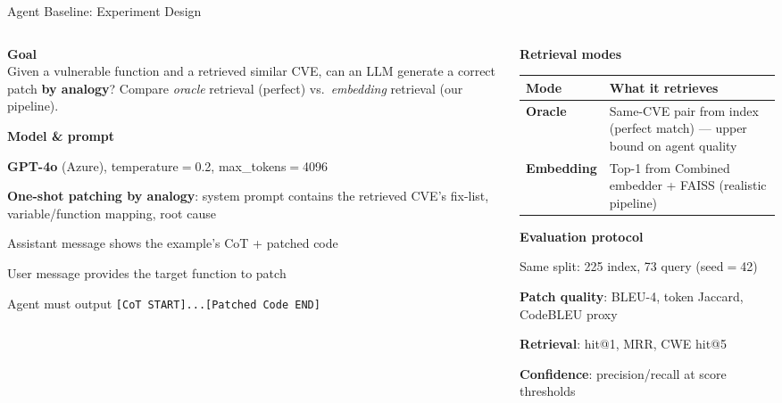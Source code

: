 \documentclass[aspectratio=169,10pt]{beamer}
\begin{document}
\begin{frame}{Agent Baseline: Experiment Design}
\begin{columns}[T]
\begin{column}{0.52\textwidth}

  \textbf{Goal}\\[3pt]
  {\small Given a vulnerable function and a retrieved similar CVE,
  can an LLM generate a correct patch \textbf{by analogy}?
  Compare \textit{oracle} retrieval (perfect) vs.\ \textit{embedding} retrieval (our pipeline).}

  \vspace{0.6em}
  \textbf{Model \& prompt}
  \begin{itemize}\setlength{\itemsep}{2pt}
    {\scriptsize
    \item \textbf{GPT-4o} (Azure), temperature$=$0.2, max\_tokens$=$4096
    \item \textbf{One-shot patching by analogy}: system prompt contains the
          retrieved CVE's fix-list, variable/function mapping, root cause
    \item Assistant message shows the example's CoT + patched code
    \item User message provides the target function to patch
    \item Agent must output \texttt{[CoT START]...[Patched Code END]}}
  \end{itemize}

\end{column}
\begin{column}{0.45\textwidth}

  \textbf{Retrieval modes}

  \vspace{0.3em}
  {\small
  \renewcommand{\arraystretch}{1.25}
  \begin{tabular}{p{1.5cm}p{4.5cm}}
    \toprule
    \textbf{Mode} & \textbf{What it retrieves} \\
    \midrule
    \textbf{Oracle}
      & Same-CVE pair from index (perfect match) — upper bound on agent quality \\
    \textbf{Embedding}
      & Top-1 from Combined embedder + FAISS (realistic pipeline) \\
    \bottomrule
  \end{tabular}}

  \vspace{0.5em}
  \textbf{Evaluation protocol}
  \begin{itemize}\setlength{\itemsep}{2pt}
    {\scriptsize
    \item Same split: 225 index, 73 query (seed$=$42)
    \item \textbf{Patch quality}: BLEU-4, token Jaccard, CodeBLEU proxy
    \item \textbf{Retrieval}: hit@1, MRR, CWE hit@5
    \item \textbf{Confidence}: precision/recall at score thresholds}
  \end{itemize}

\end{column}
\end{columns}
\end{frame}
\end{document}
